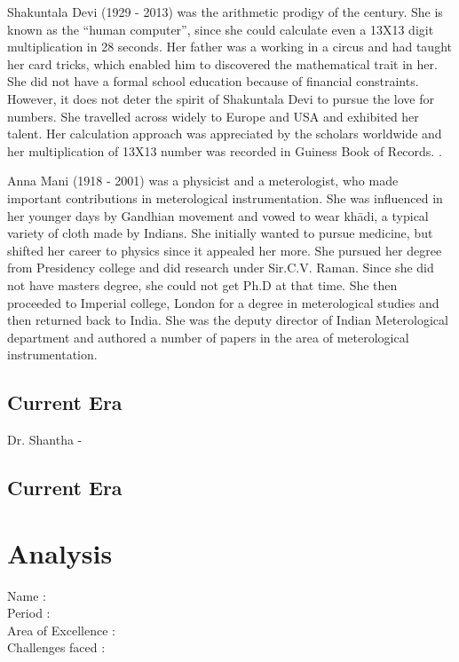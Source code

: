 \documentclass[a4paper,10pt]{article}
\begin{document}
\newblock
Shakuntala Devi (1929 - 2013) was the arithmetic prodigy of the century. She is known as the ``human computer'', since she could calculate even a 13X13 digit multiplication in 28 seconds. Her father was a working in a circus and had taught her card tricks, which enabled him to discovered the mathematical trait in her. She did not have a formal school education because of financial constraints. However, it does not deter the spirit of Shakuntala Devi to pursue the love for numbers. She travelled across widely to Europe and USA and exhibited her talent. Her calculation approach was appreciated by the scholars worldwide and her multiplication of 13X13 number was recorded in Guiness Book of Records. \cite{shakuntala}. 

\newblock
Anna Mani (1918 - 2001) was a physicist and a meterologist, who made important contributions in meterological instrumentation. She was influenced in her younger days by Gandhian movement and vowed to wear kh\={a}di, a typical variety of cloth made by Indians. She initially wanted to pursue medicine, but shifted her career to physics since it appealed her more. She pursued her degree from Presidency college and did research under Sir.C.V. Raman. Since she did not have masters degree, she could not get Ph.D at that time. She then proceeded to Imperial college, London for a degree in meterological studies and then returned back to India. She was the deputy director of Indian Meterological department and authored a number of papers in the area of meterological instrumentation. \cite{anna}

\subsection{Current Era}
Dr. Shantha - \cite{shantha}




\subsection{Current Era}
\section{Analysis}

\newblock
Name : \\
Period : \\
Area of Excellence : \\
Challenges faced : \\
\end{document}
